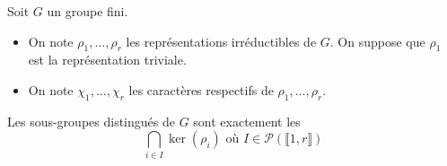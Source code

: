 





	Soit $G$ un groupe fini.

	\begin{notation}
		\begin{itemize}
			\item On note $\rho_1, \dots, \rho_r$ les représentations irréductibles de $G$. On suppose que $\rho_1$ est la représentation triviale.
			\item On note $\chi_1, \dots, \chi_r$ les caractères respectifs de $\rho_1, \dots, \rho_r$.
		\end{itemize}
	\end{notation}

	\begin{theorem}
		\label{sous-groupes-distingues-et-table-des-caracteres-1}
		Les sous-groupes distingués de $G$ sont exactement les
		\[ \bigcap_{i \in I} \ker(\rho_i) \text{ où } I \in \mathcal{P}(\llbracket 1, r \rrbracket) \]
	\end{theorem}

